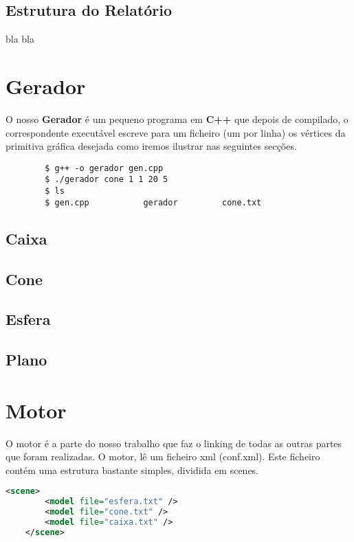 \documentclass{article}
\begin{document}
\subsection{Estrutura do Relatório}

bla bla

\section{Gerador}
O nosso \textbf{Gerador} é um pequeno programa em \textbf{C++} que depois de compilado, o correspondente executável escreve para um ficheiro (um por linha) os vértices da primitiva gráfica desejada  como iremos ilustrar nas seguintes secções.
\begin{commandline}
	\begin{verbatim}
		$ g++ -o gerador gen.cpp
		$ ./gerador cone 1 1 20 5
		$ ls
		$ gen.cpp			gerador			cone.txt
	\end{verbatim}
\end{commandline}
\subsection{Caixa}

\subsection{Cone}

\subsection{Esfera}

\subsection{Plano}

\section{Motor}
O motor é a parte do nosso trabalho que faz o linking de todas as outras partes que foram realizadas. O motor, lê um ficheiro xml (conf.xml). Este ficheiro contém uma estrutura bastante simples, dividida em scenes.

\begin{file}
	\begin{lstlisting}[language=XML]
	<scene>
		<model file="esfera.txt" />
		<model file="cone.txt" />
		<model file="caixa.txt" />
	</scene>
	\end{lstlisting}
	\end{file}
\end{document}
